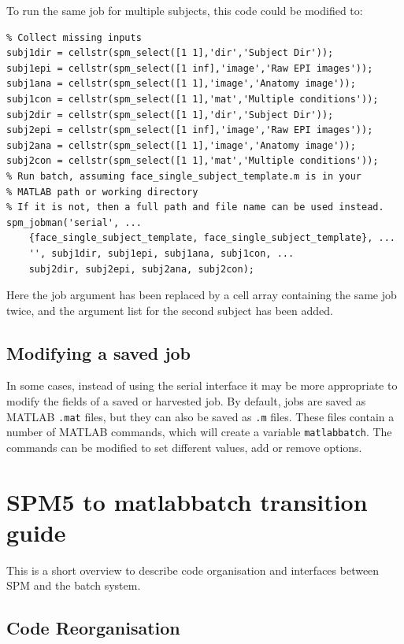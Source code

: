To run the same job for multiple subjects, this code could be modified to:

\begin{verbatim}
% Collect missing inputs
subj1dir = cellstr(spm_select([1 1],'dir','Subject Dir'));
subj1epi = cellstr(spm_select([1 inf],'image','Raw EPI images'));
subj1ana = cellstr(spm_select([1 1],'image','Anatomy image'));
subj1con = cellstr(spm_select([1 1],'mat','Multiple conditions'));
subj2dir = cellstr(spm_select([1 1],'dir','Subject Dir'));
subj2epi = cellstr(spm_select([1 inf],'image','Raw EPI images'));
subj2ana = cellstr(spm_select([1 1],'image','Anatomy image'));
subj2con = cellstr(spm_select([1 1],'mat','Multiple conditions'));
% Run batch, assuming face_single_subject_template.m is in your 
% MATLAB path or working directory
% If it is not, then a full path and file name can be used instead.
spm_jobman('serial', ...
    {face_single_subject_template, face_single_subject_template}, ...
    '', subj1dir, subj1epi, subj1ana, subj1con, ...
    subj2dir, subj2epi, subj2ana, subj2con);
\end{verbatim}

Here the job argument has been replaced by a cell array containing
the same job twice, and the argument list for the second subject has
been added.

\subsection{Modifying a saved job}

In some cases, instead of using the serial interface it may be more
appropriate to modify the fields of a saved or harvested job. By default, jobs
are saved as MATLAB \verb|.mat| files, but they can also be saved as
\verb|.m| files. These files contain a number of MATLAB commands,
which will create a variable \verb|matlabbatch|. The commands can be
modified to set different values, add or remove options. 
 
\section{SPM5 to matlabbatch transition guide}
\label{sec:overview}

This is a short overview to describe code organisation and interfaces between
SPM and the batch system.

\subsection{Code Reorganisation}
\label{sec:overcode}

